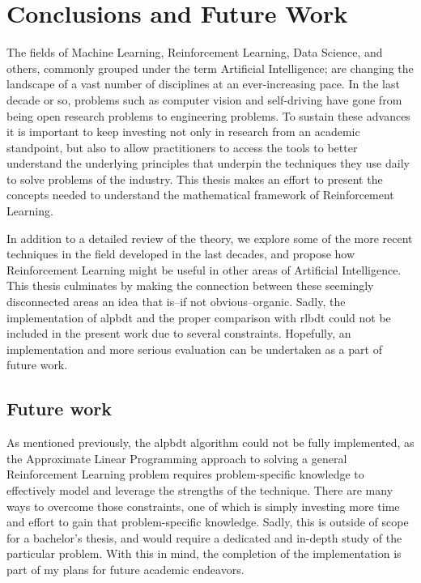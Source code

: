\chapter{Conclusions and Future Work}
\label{chapter:Conclusions}

The fields of Machine Learning, Reinforcement Learning, Data Science, and
others, commonly grouped under the term Artificial Intelligence; are changing
the landscape of a vast number of disciplines at an ever-increasing pace. In the
last decade or so, problems such as computer vision and self-driving have gone
from being open research problems to engineering problems. To sustain these
advances it is important to keep investing not only in research from an academic
standpoint, but also to allow practitioners to access the tools to better
understand the underlying principles that underpin the techniques they use daily
to solve problems of the industry. This thesis makes an effort to present the
concepts needed to understand the mathematical framework of Reinforcement
Learning.

In addition to a detailed review of the theory, we explore some of the more
recent techniques in the field developed in the last decades, and propose how
Reinforcement Learning might be useful in other areas of Artificial
Intelligence. This thesis culminates by making the connection between these
seemingly disconnected areas an idea that is--if not obvious--organic. Sadly,
the implementation of \acf{alpbdt} and the proper comparison with \acf{rlbdt}
could not be included in the present work due to several constraints. Hopefully,
an implementation and more serious evaluation can be undertaken as a part of
future work.

\section{Future work}

As mentioned previously, the \ac{alpbdt} algorithm could not be fully
implemented, as the Approximate Linear Programming approach to solving a general
Reinforcement Learning problem requires problem-specific knowledge to
effectively model and leverage the strengths of the technique. There are many
ways to overcome those constraints, one of which is simply investing more time
and effort to gain that problem-specific knowledge. Sadly, this is outside of
scope for a bachelor's thesis, and would require a dedicated and in-depth study
of the particular problem. With this in mind, the completion of the
implementation is part of my plans for future academic endeavors.

